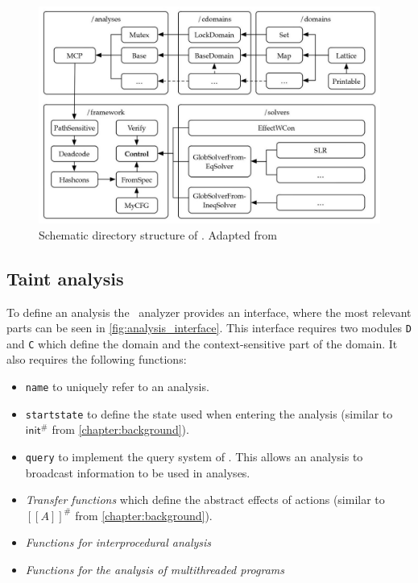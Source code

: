   \begin{figure}
    \centering
    \includegraphics{../figures/goblint_structure_detailed.jpg}
    \caption{Schematic directory structure of \gob. Adapted from \parencite{apinis2014frameworks}}
    \label{fig:gob_structure_detail}
  \end{figure}

    \subsection{Taint analysis}\label{sec:implTaint}
      To define an analysis the \gob\ analyzer provides an interface, where the most relevant parts can be seen in \autoref{fig:analysis_interface}. This interface requires two modules \texttt{D} and \texttt{C} which define the domain and the context-sensitive part of the domain. It also requires the following functions: 
      \begin{itemize}
        \item \texttt{name} to uniquely refer to an analysis.
        \item \texttt{startstate} to define the state used when entering the analysis (similar to $\textsf{init}^{\#}$ from \autoref{chapter:background}).
        \item \texttt{query} to implement the query system of \gob. This allows an analysis to broadcast information to be used in analyses.
        \item \textit{Transfer functions} which define the abstract effects of actions (similar to $[\![A]\!]^{\#}$ from \autoref{chapter:background}).
        \item \textit{Functions for interprocedural analysis}
        \item \textit{Functions for the analysis of multithreaded programs}
      \end{itemize}

